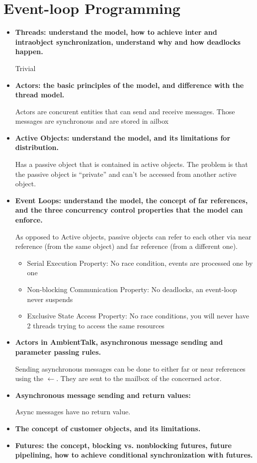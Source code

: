 \documentclass[a4paper]{report}
\begin{document}
\chapter{Event-loop Programming}
\begin{itemize}
  \item\textbf{ Threads: understand the model, how to achieve inter and intraobject synchronization,  understand why and how deadlocks happen.}

  Trivial
  \item\textbf{ Actors: the basic principles of the model, and difference with the thread model.}

  Actors are concurent entities that can send and receive messages. Those messages are synchronous and are stored in ailbox
  \item\textbf{ Active Objects: understand the model, and its limitations for distribution.}

  Has a passive object that is contained in active objects. The problem is that the passive object is ``private'' and can't be accessed from another active object.
  \item\textbf{ Event Loops: understand the model, the concept of far references, and the three concurrency control properties that the model can enforce.}

  As opposed to Active objects, passive objects can refer to each other via near reference (from the same object) and far reference (from a different one).
  \begin{itemize}
    \item Serial Execution Property: No race condition, events are processed one by one
    \item Non-blocking Communication Property: No deadlocks, an event-loop never suspends 
    \item Exclusive State Access Property: No race conditions, you will never have 2 threads trying to access the same resources
  \end{itemize}
  \item\textbf{ Actors in AmbientTalk, asynchronous message sending and parameter passing rules.}

  Sending asynchronous messages can be done to either far or near references using the $\leftarrow$. They are sent to the mailbox of the concerned actor. 
  \item\textbf{ Asynchronous message sending and return values:}

  Async messages have no return value.
  \item\textbf{ The concept of customer objects, and its limitations.}
  \item\textbf{ Futures: the concept, blocking vs. nonblocking futures, future pipelining, how to achieve conditional synchronization with futures.}
\end{itemize}
\end{document}
